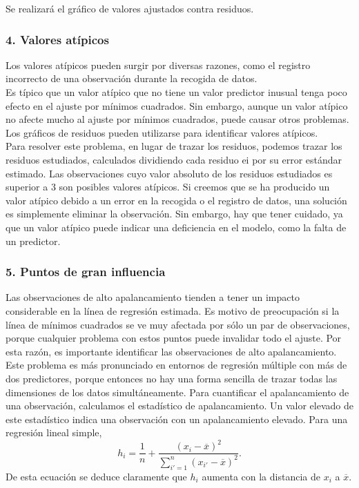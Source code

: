 Se realizará el gráfico de valores ajustados contra residuos.

\subsubsection{4. Valores atípicos}
Los valores atípicos pueden surgir por diversas razones, como el registro incorrecto de una observación durante la recogida de datos. \\

Es típico que un valor atípico que no tiene un valor predictor inusual tenga poco efecto en el ajuste por mínimos cuadrados. Sin embargo, aunque un valor atípico no afecte mucho al ajuste por mínimos cuadrados, puede causar otros problemas. Los gráficos de residuos pueden utilizarse para identificar valores atípicos. \\

Para resolver este problema, en lugar de trazar los residuos, podemos trazar los residuos estudiados, calculados dividiendo cada residuo ei por su error estándar estimado. Las observaciones cuyo valor absoluto de los residuos estudiados es superior a 3 son posibles valores atípicos. Si creemos que se ha producido un valor atípico debido a un error en la recogida o el registro de datos, una solución es simplemente eliminar la observación. Sin embargo, hay que tener cuidado, ya que un valor atípico puede indicar una deficiencia en el modelo, como la falta de un predictor.

\subsubsection{5. Puntos de gran influencia}
Las observaciones de alto apalancamiento tienden a tener un impacto considerable en la línea de regresión estimada. Es motivo de preocupación si la línea de mínimos cuadrados se ve muy afectada por sólo un par de observaciones, porque cualquier problema con estos puntos puede invalidar todo el ajuste. Por esta razón, es importante identificar las observaciones de alto apalancamiento.\\

 Este problema es más pronunciado en entornos de regresión múltiple con más de dos predictores, porque entonces no hay una forma sencilla de trazar todas las dimensiones de los datos simultáneamente. Para cuantificar el apalancamiento de una observación, calculamos el estadístico de apalancamiento. Un valor elevado de este estadístico indica una observación con un apalancamiento elevado. Para una regresión lineal simple,
 $$h_i=\dfrac{1}{n}+\dfrac{\left(x_i-\overline{x}\right)^2}{\sum_{i'=1}^n \left(x_{i'}-\overline{x}\right)^2}.$$
 De esta ecuación se deduce claramente que $h_i$ aumenta con la distancia de $x_i$ a $\overline{x}$.

